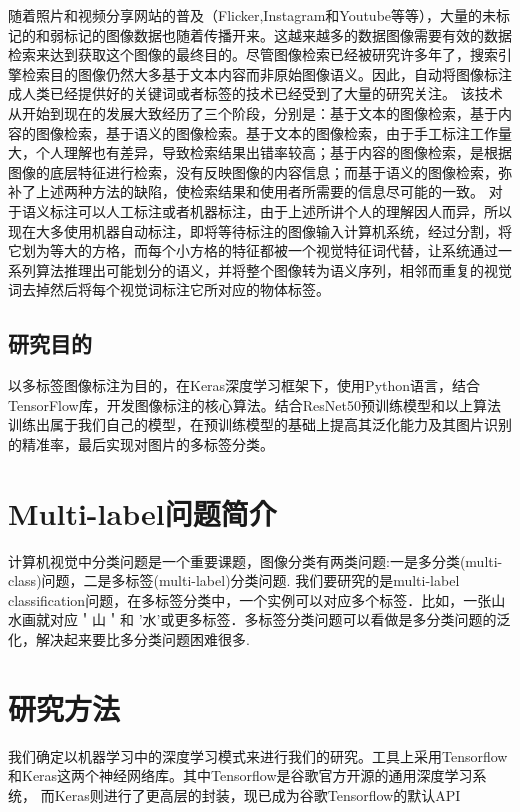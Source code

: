 随着照片和视频分享网站的普及（Flicker,Instagram和Youtube等等），大量的未标记的和弱标记的图像数据也随着传播开来。这越来越多的数据图像需要有效的数据检索来达到获取这个图像的最终目的。尽管图像检索已经被研究许多年了，搜索引擎检索目的图像仍然大多基于文本内容而非原始图像语义。因此，自动将图像标注成人类已经提供好的关键词或者标签的技术已经受到了大量的研究关注。
该技术从开始到现在的发展大致经历了三个阶段，分别是：基于文本的图像检索，基于内容的图像检索，基于语义的图像检索。基于文本的图像检索，由于手工标注工作量大，个人理解也有差异，导致检索结果出错率较高；基于内容的图像检索，是根据图像的底层特征进行检索，没有反映图像的内容信息；而基于语义的图像检索，弥补了上述两种方法的缺陷，使检索结果和使用者所需要的信息尽可能的一致。
对于语义标注可以人工标注或者机器标注，由于上述所讲个人的理解因人而异，所以现在大多使用机器自动标注，即将等待标注的图像输入计算机系统，经过分割，将它划为等大的方格，而每个小方格的特征都被一个视觉特征词代替，让系统通过一系列算法推理出可能划分的语义，并将整个图像转为语义序列，相邻而重复的视觉词去掉然后将每个视觉词标注它所对应的物体标签。


\subsection{研究目的}

以多标签图像标注为目的，在Keras深度学习框架下，使用Python语言，结合TensorFlow库，开发图像标注的核心算法。结合ResNet50预训练模型和以上算法训练出属于我们自己的模型，在预训练模型的基础上提高其泛化能力及其图片识别的精准率，最后实现对图片的多标签分类。
\section{Multi-label问题简介}

计算机视觉中分类问题是一个重要课题，图像分类有两类问题:一是多分类(multi-class)问题，二是多标签(multi-label)分类问题.
我们要研究的是multi-label classification问题，在多标签分类中，一个实例可以对应多个标签．比如，一张山水画就对应＇山＇和
'水'或更多标签．多标签分类问题可以看做是多分类问题的泛化，解决起来要比多分类问题困难很多.


\section{研究方法}

我们确定以机器学习中的深度学习模式来进行我们的研究。工具上采用Tensorflow和Keras这两个神经网络库。其中Tensorflow是谷歌官方开源的通用深度学习系统，
而Keras则进行了更高层的封装，现已成为谷歌Tensorflow的默认API

